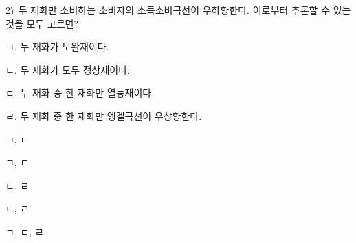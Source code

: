 \begin{question}{27}
두 재화만 소비하는 소비자의 소득소비곡선이 우하향한다. 이로부터 추론할 수 있는 것을 모두 고르면?
\begin{framedtext}
ㄱ. 두 재화가 보완재이다. \par
ㄴ. 두 재화가 모두 정상재이다. \par
ㄷ. 두 재화 중 한 재화만 열등재이다. \par
ㄹ. 두 재화 중 한 재화만 엥겔곡선이 우상향한다. \par
\end{framedtext}
\begin{choices}
  \item ㄱ, ㄴ
  \item ㄱ, ㄷ
  \item ㄴ, ㄹ
  \item ㄷ, ㄹ
  \item ㄱ, ㄷ, ㄹ
\end{choices}
\end{question}
